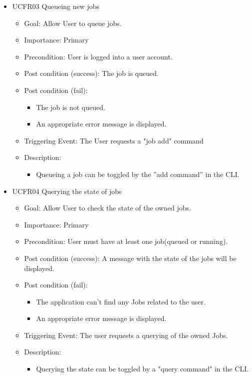 \begin{itemize}
	\item UCFR03 Queueing new jobs
	\begin{itemize}
		\item Goal: Allow User to queue jobs.
		\item Importance: Primary
		\item Precondition: User is logged into a user account.
		\item Post condition (success): The job is queued.
		\item Post condition (fail):
		\begin{itemize}
			\item The job is not queued.
			\item An appropriate error message is displayed.
		\end{itemize}
		\item Triggering Event: The User requests a "job add" command
		\item Description:
		\begin{itemize}
			\item  Queueing a job can be toggled by the ”add command” in the CLI.
		\end{itemize}
	\end{itemize}
	
	\item UCFR04 Querying the state of jobs
	\begin{itemize}
		\item Goal: Allow User to check the state of the owned jobs.
		\item Importance: Primary
		\item Precondition: User must have at least one job(queued or running).
		\item Post condition (success): A message with the state of the jobs will be displayed.
		\item Post condition (fail):
		\begin{itemize}
			\item The application can't find any Jobs related to the user.
			\item An appropriate error message is displayed.
		\end{itemize}
		\item Triggering Event: The user requests a querying of the owned Jobs.
		\item Description:
		\begin{itemize}
			\item Querying the state can be toggled by a "query command" in the CLI.
		\end{itemize}
	\end{itemize}
	

\end{itemize}
